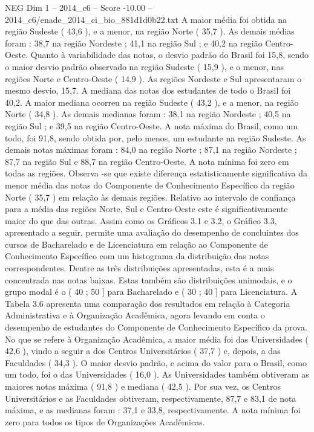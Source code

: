 \begin{textsample}{NEG Dim 1 – 2014\_c6 – Score -10.00 – 2014\_c6/enade\_2014\_ci\_bio\_881d1d0b22.txt}
A maior média foi obtida na região Sudeste ( 43,6 ), e a menor, na região Norte ( 35,7 ).
As demais médias foram : 38,7 na região Nordeste ; 41,1 na região Sul ; e 40,2 na região Centro-Oeste.
Quanto à variabilidade das notas, o desvio padrão do Brasil foi 15,8, sendo o maior desvio padrão observado na região Sudeste ( 15,9 ), e o menor, nas regiões Norte e Centro-Oeste ( 14,9 ).
As regiões Nordeste e Sul apresentaram o mesmo desvio, 15,7.
A mediana das notas dos estudantes de todo o Brasil foi 40,2.
A maior mediana ocorreu na região Sudeste ( 43,2 ), e a menor, na região Norte ( 34,8 ).
As demais medianas foram : 38,1 na região Nordeste ; 40,5 na região Sul ; e 39,5 na região Centro-Oeste.
A nota máxima do Brasil, como um todo, foi 91,8, sendo obtida por, pelo menos, um estudante na região Sudeste.
As demais notas máximas foram : 84,0 na região Norte ; 87,1 na região Nordeste ; 87,7 na região Sul e 88,7 na região Centro-Oeste.
A nota mínima foi zero em todas as regiões.
Observa -se que existe diferença estatisticamente significativa da menor média das notas do Componente de Conhecimento Específico da região Norte ( 35,7 ) em relação às demais regiões.
Relativo ao intervalo de confiança para a média das regiões Norte, Sul e Centro-Oeste este é significativamente maior do que das outras.
Assim como os Gráficos 3.1 e 3.2, o Gráfico 3.3, apresentado a seguir, permite uma avaliação do desempenho de concluintes dos cursos de Bacharelado e de Licenciatura em relação ao Componente de Conhecimento Específico com um histograma da distribuição das notas correspondentes.
Dentre as três distribuições apresentadas, esta é a mais concentrada nas notas baixas.
Estas também são distribuições unimodais, e o grupo modal é o ( 40 ; 50 ] para Bacharelado e ( 30 ; 40 ] para Licenciatura.
A Tabela 3.6 apresenta uma comparação dos resultados em relação à Categoria Administrativa e à Organização Acadêmica, agora levando em conta o desempenho de estudantes do Componente de Conhecimento Específico da prova.
No que se refere à Organização Acadêmica, a maior média foi das Universidades ( 42,6 ), vindo a seguir a dos Centros Universitários ( 37,7 ) e, depois, a das Faculdades ( 34,3 ).
O maior desvio padrão, e acima do valor para o Brasil, como um todo, foi o das Universidades ( 16,0 ).
As Universidades também obtiveram as maiores notas máxima ( 91,8 ) e mediana ( 42,5 ).
Por sua vez, os Centros Universitários e as Faculdades obtiveram, respectivamente, 87,7 e 83,1 de nota máxima, e as medianas foram : 37,1 e 33,8, respectivamente.
A nota mínima foi zero para todos os tipos de Organizações Acadêmicas.

\end{textsample}

